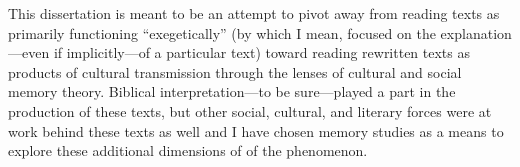 This dissertation is meant to be an attempt to pivot away from reading
\rwb texts as primarily functioning ``exegetically'' (by
which I mean, focused on the explanation---even if implicitly---of a
particular text) toward reading rewritten texts as products of cultural
transmission through the lenses of cultural and social memory theory.
Biblical interpretation---to be sure---played a part in the production
of these texts, but other social, cultural, and literary forces were at
work behind these texts as well and I have chosen memory studies as a
means to explore these additional dimensions of of the
\rwb phenomenon.
